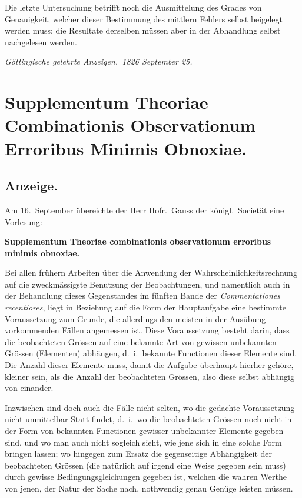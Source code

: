 \documentclass[12pt,a4paper]{article}
\begin{document}
Die letzte Untersuchung betrifft noch die Ausmittelung des Grades von Genauigkeit, welcher dieser Bestimmung des mittlern Fehlers selbst beigelegt werden muss: die Resultate derselben m\"ussen aber in der Abhandlung selbst nachgelesen werden.

\begin{flushright}
\textit{G\"ottingische gelehrte Anzeigen.\ 1826 September 25.}
\end{flushright}

\newpage

\section*{Supplementum Theoriae Combinationis Observationum Erroribus Minimis Obnoxiae.}

\subsection*{Anzeige.}

Am 16.\ September \"ubereichte der Herr Hofr.\ Gauss der k\"onigl.\ Societ\"at eine Vorlesung:

\begin{center}
\textbf{Supplementum Theoriae combinationis observationum erroribus minimis obnoxiae.}
\end{center}

Bei allen fr\"uhern Arbeiten \"uber die Anwendung der Wahrscheinlichkeitsrechnung auf die zweckm\"assigste Benutzung der Beobachtungen, und namentlich auch in der Behandlung dieses Gegenstandes im f\"unften Bande der \textit{Commentationes recentiores}, liegt in Beziehung auf die Form der Hauptaufgabe eine bestimmte Voraussetzung zum Grunde, die allerdings den meisten in der Aus\"ubung vorkommenden F\"allen angemessen ist. Diese Voraussetzung besteht darin, dass die beobachteten Gr\"ossen auf eine bekannte Art von gewissen unbekannten Gr\"ossen (Elementen) abh\"angen, d.\ i.\ bekannte Functionen dieser Elemente sind. Die Anzahl dieser Elemente muss, damit die Aufgabe \"uberhaupt hierher geh\"ore, kleiner sein, als die Anzahl der beobachteten Gr\"ossen, also diese selbst abh\"angig von einander.

Inzwischen sind doch auch die F\"alle nicht selten, wo die gedachte Voraussetzung nicht unmittelbar Statt findet, d.\ i.\ wo die beobachteten Gr\"ossen noch nicht in der Form von bekannten Functionen gewisser unbekannter Elemente gegeben sind, und wo man auch nicht sogleich sieht, wie jene sich in eine solche Form bringen lassen; wo hingegen zum Ersatz die gegenseitige Abh\"angigkeit der beobachteten Gr\"ossen (die nat\"urlich auf irgend eine Weise gegeben sein muss) durch gewisse Bedingungsgleichungen gegeben ist, welchen die wahren Werthe von jenen, der Natur der Sache nach, nothwendig genau Gen\"uge leisten m\"ussen.
\end{document}
